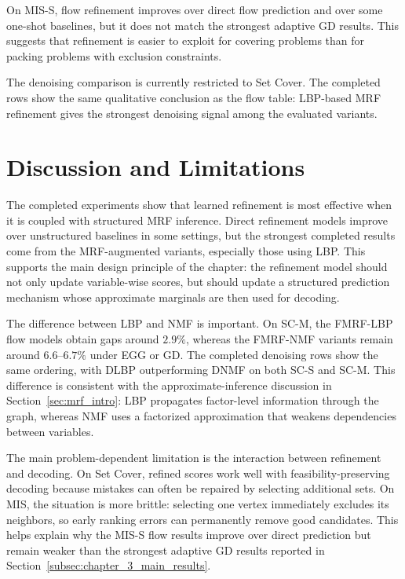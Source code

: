 On MIS-S, flow refinement improves over direct flow prediction and over some one-shot baselines, but it does not match the strongest adaptive GD results. This suggests that refinement is easier to exploit for covering problems than for packing problems with exclusion constraints.

The denoising comparison is currently restricted to Set Cover. The completed rows show the same qualitative conclusion as the flow table: LBP-based MRF refinement gives the strongest denoising signal among the evaluated variants.

\section{Discussion and Limitations}
\label{sec:chapter_4_discussion_limitations}

The completed experiments show that learned refinement is most effective when it is coupled with structured MRF inference. Direct refinement models improve over unstructured baselines in some settings, but the strongest completed results come from the MRF-augmented variants, especially those using LBP. This supports the main design principle of the chapter: the refinement model should not only update variable-wise scores, but should update a structured prediction mechanism whose approximate marginals are then used for decoding.

The difference between LBP and NMF is important. On SC-M, the FMRF-LBP flow models obtain gaps around $2.9\%$, whereas the FMRF-NMF variants remain around $6.6$--$6.7\%$ under EGG or GD. The completed denoising rows show the same ordering, with DLBP outperforming DNMF on both SC-S and SC-M. This difference is consistent with the approximate-inference discussion in Section~\ref{sec:mrf_intro}: LBP propagates factor-level information through the graph, whereas NMF uses a factorized approximation that weakens dependencies between variables.

The main problem-dependent limitation is the interaction between refinement and decoding. On Set Cover, refined scores work well with feasibility-preserving decoding because mistakes can often be repaired by selecting additional sets. On MIS, the situation is more brittle: selecting one vertex immediately excludes its neighbors, so early ranking errors can permanently remove good candidates. This helps explain why the MIS-S flow results improve over direct prediction but remain weaker than the strongest adaptive GD results reported in Section~\ref{subsec:chapter_3_main_results}.

